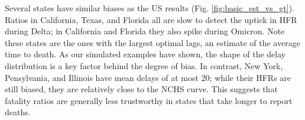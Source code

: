 \documentclass{article}
\begin{document}
Several states have similar biases as the US results (Fig. \ref{fig:basic_est_vs_gt}). Ratios in California, Texas, and Florida all are slow to detect the uptick in HFR during Delta; in California and Florida they also spike during Omicron. Note these states are the ones with the largest optimal lags, an estimate of the average time to death. As our simulated examples have shown, the shape of the delay distribution is a key factor behind the degree of bias. In contrast, New York, Pensylvania, and Illinois have mean delays of at most 20; while their HFRs are still biased, they are relatively close to the NCHS curve. This suggests that fatality ratios are generally less trustworthy in states that take longer to report deaths.
\end{document}

